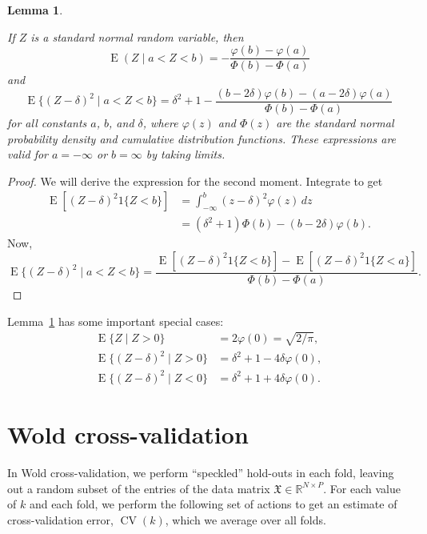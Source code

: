 \documentclass[12pt]{article}
\newtheorem{lemma}{Lemma}
\newcommand{\CV}{\operatorname{CV}}
\newcommand{\E}{\operatorname{E}}
\newcommand{\R}{\mathbb{R}}
\newcommand{\dataX}{\mathfrak{X}}
\begin{document}
\begin{lemma}\label{lem:truncated-normal-moments}

If $Z$ is a standard normal random variable, then
\[
  \E(Z \mid a < Z < b)
    = - \frac{\varphi(b) - \varphi(a)}
             {\Phi(b) - \Phi(a)}
\]
and
\[
  \E\{(Z - \delta)^2 \mid a < Z < b\}
    = \delta^2 + 1
    - \frac{  (b - 2 \delta) \varphi(b)
            - (a - 2 \delta) \varphi(a)}
           {\Phi(b) - \Phi(a)}
\]
for all constants $a$, $b$, and $\delta$, where $\varphi(z)$ and $\Phi(z)$ are
the standard normal probability density and cumulative distribution functions.
These expressions are valid for $a = -\infty$ or $b = \infty$ by taking
limits.

\end{lemma}
\begin{proof}
We will derive the expression for the second moment.  Integrate to get
\begin{align*}
  \E[ (Z - \delta)^2 1\{Z < b\}]
    &= \int_{-\infty}^b (z - \delta)^2 \varphi(z) \, dz \\
    &= (\delta^2 + 1) \Phi(b) - (b - 2 \delta) \varphi(b).
\end{align*}
Now,
\[
  \E\{(Z - \delta)^2 \mid a < Z < b\}
    =
    \frac{  \E[ (Z - \delta)^2 1\{Z < b\}]
          - \E[ (Z - \delta)^2 1\{Z < a\}]}
         { \Phi(b) - \Phi(a) }.
\]
\end{proof}

Lemma~\ref{lem:truncated-normal-moments} has some important special cases:
\begin{align*}
  \E\{Z \mid Z > 0\} &= 2 \varphi(0) = \sqrt{2 / \pi}, \\
  \E\{(Z - \delta)^2 \mid Z > 0 \}
    &= \delta^2 + 1 - 4 \delta \varphi(0), \\
  \E\{(Z - \delta)^2 \mid Z < 0 \}
    &= \delta^2 + 1 + 4 \delta \varphi(0).
\end{align*}


\section{Wold cross-validation}
\label{sec:wold-cv}

In Wold cross-validation, we perform ``speckled'' hold-outs in each fold, leaving out a
random subset of the entries of the data matrix $\dataX \in \R^{N \times P}$. For each value
of $k$ and each fold, we perform the following set of actions to get an
estimate of cross-validation error, $\CV(k)$, which we average over all folds.
\end{document}
